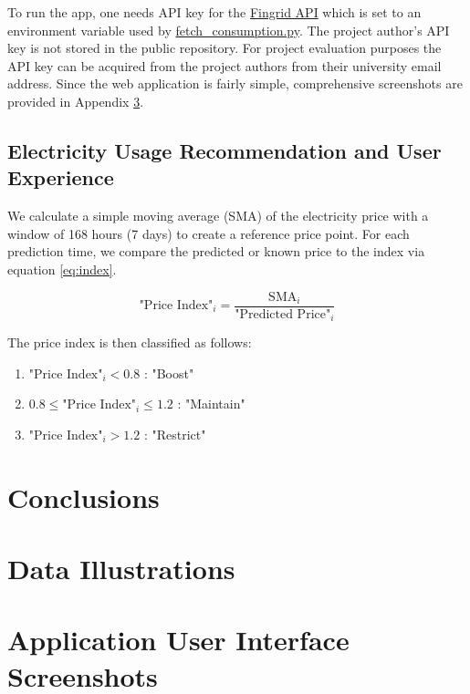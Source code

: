\documentclass{article}
\begin{document}
To run the app, one needs API key for the \href{https://data.fingrid.fi/open-data-forms/registration/}{Fingrid API} which is set to an environment variable used by \href{https://github.com/IDS-mini/electricity/blob/main/src/app/utils/fetch_consumption.py}{fetch\_consumption.py}. The project author's API key is not stored in the public repository. For project evaluation purposes the API key can be acquired from the project authors from their university email address. Since the web application is fairly simple, comprehensive screenshots are provided in Appendix \ref{section:appendixb}.

\subsection{Electricity Usage Recommendation and User Experience}
\label{subsection:ux}

We calculate a simple moving average (SMA) of the electricity price with a window of 168 hours (7 days) to create a reference price point. For each prediction time, we compare the predicted or known price to the index via equation \ref{eq:index}.


\begin{equation} \label{eq:index}
\text{"Price Index"}_i = \frac{\text{SMA}_i}{\text{"Predicted Price"}_i}
\end{equation}

The price index is then classified as follows:

\begin{enumerate}
    \item $\text{"Price Index"}_i < 0.8$ : "Boost"
    \item $0.8 \leq \text{"Price Index"}_i \leq 1.2$ : "Maintain"
    \item $\text{"Price Index"}_i > 1.2$ : "Restrict"
\end{enumerate}

\section{Conclusions}
\label{section:conclusions}



\appendix
\section{Data Illustrations}

\label{section:appendixa}

\section{Application User Interface Screenshots}

\label{section:appendixb}
\end{document}
